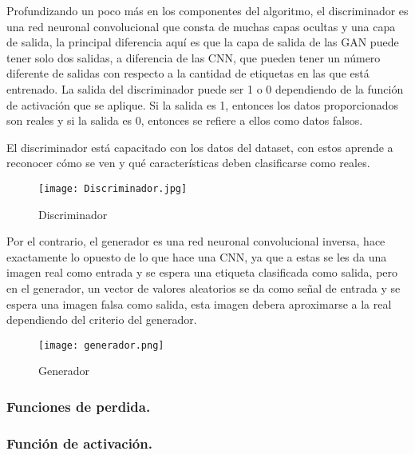 Profundizando un poco más en los componentes del algoritmo, el discriminador es una red neuronal convolucional que consta de muchas 
capas ocultas y una capa de salida, la principal diferencia aquí es que la capa de salida de las GAN puede tener solo dos salidas, 
a diferencia de las CNN, que pueden tener un número diferente de salidas con respecto a la cantidad de etiquetas en las que está entrenado.
La salida del discriminador puede ser 1 o 0 dependiendo de la función de activación que se aplique. Si la salida es 1, 
entonces los datos proporcionados son reales y si la salida es 0, entonces se refiere a ellos como datos falsos.

El discriminador está capacitado con los datos del dataset, con estos aprende a reconocer cómo se ven y qué características deben 
clasificarse como reales.




\begin{figure}[H]
    \begin{center}
      \texttt{[image: Discriminador.jpg]}
      \caption{Discriminador}
      \label{Alexis2}
    \end{center}
\end{figure}


Por el contrario, el generador es una red neuronal convolucional inversa, hace exactamente lo opuesto de lo que hace una CNN, ya que 
a estas se les da una imagen real como entrada y se espera una etiqueta clasificada como salida, 
pero en el generador, un vector de valores aleatorios se da como señal de entrada 
y se espera una imagen falsa como salida, esta imagen debera aproximarse a la real dependiendo del criterio
del generador.



\begin{figure}[H]
    \begin{center}
      \texttt{[image: generador.png]}
      \caption{Generador}
      \label{Alexis3}
    \end{center}
\end{figure}
    
    \subsubsection{Funciones de perdida.}






    
    \subsubsection{Función de activación.}


